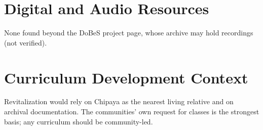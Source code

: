 \documentclass[12pt]{article}
\begin{document}
\section{Digital and Audio Resources}
None found beyond the DoBeS project page, whose archive may hold recordings (not verified).
\section{Curriculum Development Context}
Revitalization would rely on Chipaya as the nearest living relative and on archival documentation. The communities' own request for classes is the strongest basis; any curriculum should be community-led.
\end{document}
